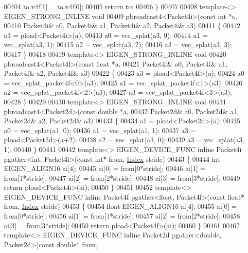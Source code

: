 \begin{DoxyCode}
{00404   to.v4f[1] = to.v4f[0];
00405   \textcolor{keywordflow}{return} to;
00406 \}
00407 
00408 \textcolor{keyword}{template}<> EIGEN\_STRONG\_INLINE \textcolor{keywordtype}{void}
00409 pbroadcast4<Packet4i>(\textcolor{keyword}{const} \textcolor{keywordtype}{int} *a,
00410                       Packet4i& a0, Packet4i& a1, Packet4i& a2, Packet4i& a3)
00411 \{
00412   a3 = pload<Packet4i>(a);
00413   a0 = vec\_splat(a3, 0);
00414   a1 = vec\_splat(a3, 1);
00415   a2 = vec\_splat(a3, 2);
00416   a3 = vec\_splat(a3, 3);
00417 \}
00418 
00419 \textcolor{keyword}{template}<> EIGEN\_STRONG\_INLINE \textcolor{keywordtype}{void}
00420 pbroadcast4<Packet4f>(\textcolor{keyword}{const} \textcolor{keywordtype}{float} *a,
00421                       Packet4f& a0, Packet4f& a1, Packet4f& a2, Packet4f& a3)
00422 \{
00423   a3 = pload<Packet4f>(a);
00424   a0 = vec\_splat\_packet4f<0>(a3);
00425   a1 = vec\_splat\_packet4f<1>(a3);
00426   a2 = vec\_splat\_packet4f<2>(a3);
00427   a3 = vec\_splat\_packet4f<3>(a3);
00428 \}
00429 
00430 \textcolor{keyword}{template}<> EIGEN\_STRONG\_INLINE \textcolor{keywordtype}{void}
00431 pbroadcast4<Packet2d>(\textcolor{keyword}{const} \textcolor{keywordtype}{double} *a,
00432                       Packet2d& a0, Packet2d& a1, Packet2d& a2, Packet2d& a3)
00433 \{
00434   a1 = pload<Packet2d>(a);
00435   a0 = vec\_splat(a1, 0);
00436   a1 = vec\_splat(a1, 1);
00437   a3 = pload<Packet2d>(a+2);
00438   a2 = vec\_splat(a3, 0);
00439   a3 = vec\_splat(a3, 1);
00440 \}
00441 
00442 \textcolor{keyword}{template}<> EIGEN\_DEVICE\_FUNC \textcolor{keyword}{inline} Packet4i pgather<int, Packet4i>(\textcolor{keyword}{const} \textcolor{keywordtype}{int}* from, 
      \hyperlink{namespace_eigen_a62e77e0933482dafde8fe197d9a2cfde}{Index} stride)
00443 \{
00444   \textcolor{keywordtype}{int} EIGEN\_ALIGN16 ai[4];
00445   ai[0] = from[0*stride];
00446   ai[1] = from[1*stride];
00447   ai[2] = from[2*stride];
00448   ai[3] = from[3*stride];
00449  \textcolor{keywordflow}{return} pload<Packet4i>(ai);
00450 \}
00451 
00452 \textcolor{keyword}{template}<> EIGEN\_DEVICE\_FUNC \textcolor{keyword}{inline} Packet4f pgather<float, Packet4f>(\textcolor{keyword}{const} \textcolor{keywordtype}{float}* from, 
      \hyperlink{namespace_eigen_a62e77e0933482dafde8fe197d9a2cfde}{Index} stride)
00453 \{
00454   \textcolor{keywordtype}{float} EIGEN\_ALIGN16 ai[4];
00455   ai[0] = from[0*stride];
00456   ai[1] = from[1*stride];
00457   ai[2] = from[2*stride];
00458   ai[3] = from[3*stride];
00459  \textcolor{keywordflow}{return} pload<Packet4f>(ai);
00460 \}
00461 
00462 \textcolor{keyword}{template}<> EIGEN\_DEVICE\_FUNC \textcolor{keyword}{inline} Packet2d pgather<double, Packet2d>(\textcolor{keyword}{const} \textcolor{keywordtype}{double}* from, 
}
\end{DoxyCode}
